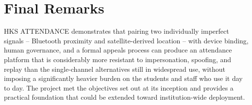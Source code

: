 \documentclass[12pt, a4paper, oneside]{report}
\begin{document}
\section{Final Remarks}

HKS ATTENDANCE demonstrates that pairing two individually imperfect signals -- Bluetooth proximity and satellite-derived location -- with device binding, human governance, and a formal appeals process can produce an attendance platform that is considerably more resistant to impersonation, spoofing, and replay than the single-channel alternatives still in widespread use, without imposing a significantly heavier burden on the students and staff who use it day to day. The project met the objectives set out at its inception and provides a practical foundation that could be extended toward institution-wide deployment.

\end{document}
